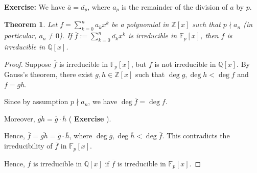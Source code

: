 \documentclass[a4paper,12pt]{report}
\newcommand{\ol}[1]{\overline{#1}}
\newcounter{statement}
\numberwithin{statement}{chapter}
\newtheorem{thm}[statement]{Theorem}
\numberwithin{equation}{chapter}
\numberwithin{section}{chapter}
\numberwithin{subsection}{section}
\begin{document}
 {\bf Exercise:}  We have $\ol{a} = \ol{a_p}$, where $a_p$ is the remainder of the division of $a$ by $p$.



\begin{thm}
Let $f = \sum_{k = 0}^na_k x^k$ be a polynomial in $\mathbb{Z}[x]$
such that $p \nmid a_n$ (in particular, $a_n \neq 0$).
If $\ol{f} := \sum_{k = 0}^n \ol{a_k}x^k$ is irreducible in $\mathbb{F}_p[x]$,
then $f$ is irreducible in $\mathbb{Q}[x]$.
\end{thm}
\begin{proof}

Suppose $\ol{f}$ is irreducible in $\mathbb{F}_p[x]$,
but $f$ is not irreducible in $\mathbb{Q}[x]$.
By Gauss's theorem, there exist $g, h \in \mathbb{Z}[x]$ such that
$\deg g, \deg h  < \deg f$ and $f = gh$.


Since by assumption $p \nmid a_n$, we have $\deg \ol{f} = \deg f$.


Moreover, $\ol{gh} = \ol{g}\cdot\ol{h}$ ( {\bf Exercise} ).


Hence, $\ol{f} = \ol{gh} = \ol{g}\cdot \ol{h}$, where $\deg \ol{g}, \deg\ol{h} < \deg \ol{f}$.
This contradicts the irreducibility of $\ol{f}$ in $\mathbb{F}_p[x]$.


Hence, $f$ is irreducible in $\mathbb{Q}[x]$ if $\ol{f}$ is irreducible in $\mathbb{F}_p[x]$.


\end{proof}
\end{document}
